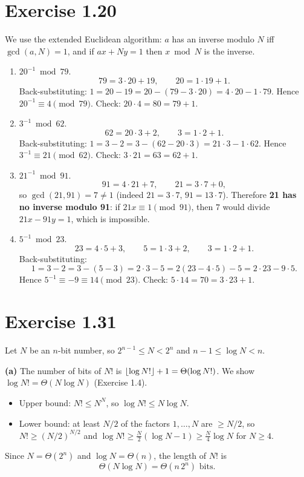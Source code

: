 \documentclass[11pt]{article}
\DeclarePairedDelimiter{\floor}{\lfloor}{\rfloor}
\theoremstyle{definition}
\begin{document}
\section*{Exercise 1.20}

We use the extended Euclidean algorithm: $a$ has an inverse modulo $N$ iff $\gcd(a,N)=1$, and if
$ax+Ny=1$ then $x\bmod N$ is the inverse.

\begin{enumerate}[leftmargin=2.2em, itemsep=0.6em]
\item $20^{-1}\bmod 79$.
  \[
    79=3\cdot20+19,\qquad 20=1\cdot19+1 .
  \]
  Back-substituting: $1=20-19=20-(79-3\cdot20)=4\cdot20-1\cdot79$.
  Hence $20^{-1}\equiv \boxed{4}\pmod{79}$. Check: $20\cdot4=80=79+1$.

\item $3^{-1}\bmod 62$.
  \[
    62=20\cdot3+2,\qquad 3=1\cdot2+1 .
  \]
  Back-substituting: $1=3-2=3-(62-20\cdot3)=21\cdot3-1\cdot62$.
  Hence $3^{-1}\equiv \boxed{21}\pmod{62}$. Check: $3\cdot21=63=62+1$.

\item $21^{-1}\bmod 91$.
  \[
    91=4\cdot21+7,\qquad 21=3\cdot7+0 ,
  \]
  so $\gcd(21,91)=7\neq1$ (indeed $21=3\cdot7$, $91=13\cdot7$). Therefore
  \textbf{21 has no inverse modulo 91}: if $21x\equiv1\pmod{91}$, then $7$ would divide
  $21x-91y=1$, which is impossible.

\item $5^{-1}\bmod 23$.
  \[
    23=4\cdot5+3,\qquad 5=1\cdot3+2,\qquad 3=1\cdot2+1 .
  \]
  Back-substituting:
  \[
    1=3-2=3-(5-3)=2\cdot3-5=2(23-4\cdot5)-5=2\cdot23-9\cdot5 .
  \]
  Hence $5^{-1}\equiv-9\equiv \boxed{14}\pmod{23}$. Check: $5\cdot14=70=3\cdot23+1$.
\end{enumerate}

\section*{Exercise 1.31}

Let $N$ be an $n$-bit number, so $2^{n-1}\le N<2^n$ and $n-1\le\log N<n$.

\textbf{(a)} The number of bits of $N!$ is $\floor{\log N!}+1=\Theta(\log N!)$. We show
$\log N!=\Theta(N\log N)$ (Exercise 1.4).
\begin{itemize}[itemsep=0.2em]
\item Upper bound: $N!\le N^N$, so $\log N!\le N\log N$.
\item Lower bound: at least $N/2$ of the factors $1,\dots,N$ are $\ge N/2$, so $N!\ge (N/2)^{N/2}$ and
  $\log N!\ge\frac N2(\log N-1)\ge\frac N4\log N$ for $N\ge4$.
\end{itemize}
Since $N=\Theta(2^n)$ and $\log N=\Theta(n)$, the length of $N!$ is
\[
  \Theta(N\log N)=\boxed{\Theta(n\,2^n)}\text{ bits.}
\]
\end{document}
